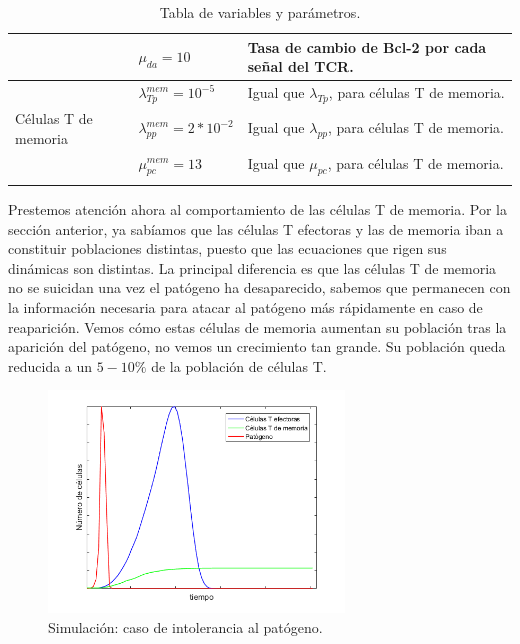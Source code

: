 \begin{table}[h]
\begin{center}
\begin{tabular}{>{\centering\arraybackslash}m{2cm} >{\arraybackslash}m{3cm} >{\arraybackslash}m{7cm} }
			& $\mu_{da} = 10$                 & Tasa de cambio de Bcl-2 por cada señal del TCR.           \\ \hline
			\multirow{4}{*}{} & $\lambda_{Tp}^{mem} = 10^{-5}$   & Igual que $\lambda_{Tp}$, para células T de memoria.      \\ \cline{2-3}
			Células T de memoria        & $\lambda_{pp}^{mem} = 2*10^{-2}$ & Igual que $\lambda_{pp}$, para células T de memoria.      \\ \cline{2-3}
			& $\mu_{pc}^{mem} = 13$           & Igual que $\mu_{pc}$, para células T de memoria.          \\ \cline{2-3}\hline
		\end{tabular}
		\caption{Tabla de variables y parámetros.}
		\label{tabla:param}
	\end{center}
\end{table}


Prestemos atención ahora al comportamiento de las células T de memoria. Por la sección anterior, ya sabíamos que las células T efectoras y las de memoria iban a constituir poblaciones distintas, puesto que las ecuaciones que rigen sus dinámicas son distintas. La principal diferencia es que las células T de memoria no se suicidan una vez el patógeno ha desaparecido, sabemos que permanecen con la información necesaria para atacar al patógeno más rápidamente en caso de reaparición. Vemos cómo estas células de memoria aumentan su población tras la aparición del patógeno, no vemos un crecimiento tan grande. Su población queda reducida a un $5-10\%$ de la población de células T.


\begin{figure}[t]
	\centering
	\includegraphics[width=0.7\textwidth]{Imagenes/Simulaciones/intolerance}
	\caption{Simulación: caso de intolerancia al patógeno.}
	\label{fig:intolerance}
\end{figure}

